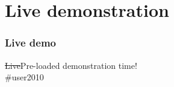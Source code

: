 \documentclass[xcolor=dvipsnames, 9pt]{beamer}
\begin{document}
\section{Live demonstration} %
\label{sec:live_demonstration}

\begin{frame}[fragile]
    \frametitle{Live demo}
    \begin{center}
        \Huge{\sout{Live}Pre-loaded demonstration time!\\ \#user2010}\\
    \end{center}
\end{frame}

\end{document}
